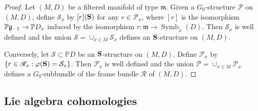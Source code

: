 \documentclass[12pt]{amsart}
\theoremstyle{plain}
\theoremstyle{definition}
\def\Symb{\operatorname{Symb}}
\begin{document}
\begin{proof} Let $(M,D)$ be a filtered manifold of type $\mathfrak m$.
Given   a $G_0$-structure  $\mathscr P$  on $(M,D)$, define $\mathcal S_x$ by $[r] ({\bf S})$ for any $r \in \mathscr P_{x}$, where $[r]$ is the isomorphism $\mathbb P {\frak g_{-1}}  \rightarrow \mathbb P D_x$ induced by the isomorphism  $r:\mathfrak m \rightarrow \Symb_x(D)$. Then $\mathcal S_x$ is well defined and the union $\mathcal S= \cup_{x \in M} \mathcal S_x$ defines an ${\bf S}$-structure on $(M,D)$.

Conversely, let $\mathcal S \subset \mathbb P D$ be an ${\bf S}$-structure on $(M,D)$. Define $\mathscr P_x$ by $\{ r \in \mathscr R_x: \varphi ({\bf S}) = \mathcal S_x \}$. Then $\mathscr P_x$ is well defined and the union $\mathscr P= \cup_{x \in M} \mathscr P_x$ defines a $G_0$-subbundle of the frame bundle $\mathscr R$ of $(M,D)$.
\end{proof}


\subsection{Lie algebra cohomologies}
\end{document}
